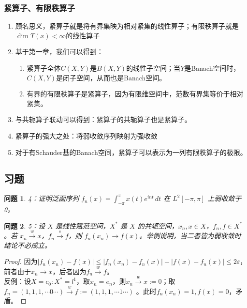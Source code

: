 \documentclass[a4paper, 12pt]{ctexart}
\newtheorem*{theorem}{问题}%
\begin{document}
\subsubsection{紧算子、有限秩算子}
\begin{enumerate}
    \item 顾名思义，紧算子就是将有界集映为相对紧集的线性算子；有限秩算子就是$\dim T(x)<\infty$的线性算子
    \item 基于第一章，我们可以得到：
    \begin{enumerate}
        \item 紧算子全体$C(X,Y)$是$B(X,Y)$的线性子空间；当$Y$是Banach空间时，$C(X,Y)$是闭子空间，从而也是Banach空间。
        \item 有界的有限秩算子是紧算子，因为有限维空间中，范数有界集等价于相对紧集。
    \end{enumerate}
    \item 与共轭算子联动可以得到：紧算子的共轭算子也是紧算子。
    \item 紧算子的强大之处：将弱收敛序列映射为强收敛
    \item 对于有Schauder基的Banach空间，紧算子可以表示为一列有限秩算子的极限。
\end{enumerate}
\subsection{习题}
\begin{theorem}
4：证明泛函序列 $f_n(x) = \int_{-\pi}^{\pi} x(t) e^{int} \, dt$ 在 $L^2[-\pi,\pi]$ 上弱收敛于 0。
\end{theorem}


\begin{theorem}
5：设 $X$ 是线性赋范空间，$X^{*}$ 是 $X$ 的共轭空间，$x_n, x \in X$，$f_n, f \in X^*$。若 $x_n \overset{w}{\rightarrow} x$，$f_n \overset{s}{\rightarrow} f$，则 $f_n(x_n) \rightarrow f(x)$。举例说明，当二者皆为弱收敛时结论不必成立。
\end{theorem}

\begin{proof}
因为$|f_n(x_n)-f(x)| \leq |f_n(x_n)-f_n(x)|+|f(x)-f_n(x)|\leq 2\varepsilon$，前者由于$x_n \to x$，后者因为$f_n \overset{w}{\rightarrow} f$。
\\
反例：设$X=c_0:X^*=l^1$，取$x_n=e_n$，则$x_n\overset{w}{\rightarrow}x:=0$；取$f_n=(1,1,1,\cdots 0 \cdots)\overset{w}{\rightarrow}f:=(1,1,1,\cdots 1 \cdots)$
。此时$f_n(x_n)=1,f(x)=0$，矛盾。
\end{proof}
\end{document}

